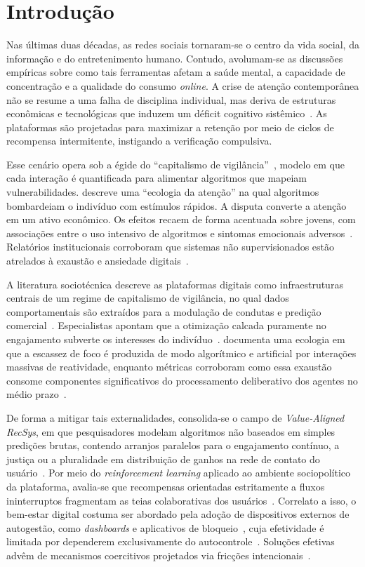 \documentclass{sbc2023}
\begin{document}
\section{Introdu{\c c}{\~a}o} \label{sec:intro}

Nas últimas duas décadas, as redes sociais tornaram-se o centro da vida social, da informação e do entretenimento humano. Contudo, avolumam-se as discussões empíricas sobre como tais ferramentas afetam a saúde mental, a capacidade de concentração e a qualidade do consumo \textit{online}. A crise de atenção contemporânea não se resume a uma falha de disciplina individual, mas deriva de estruturas econômicas e tecnológicas que induzem um déficit cognitivo sistêmico~\citep{hari2022}. As plataformas são projetadas para maximizar a retenção por meio de ciclos de recompensa intermitente, instigando a verificação compulsiva.

Esse cenário opera sob a égide do ``capitalismo de vigilância''~\citep{zuboff2019}, modelo em que cada interação é quantificada para alimentar algoritmos que mapeiam vulnerabilidades. \citet{citton2017} descreve uma ``ecologia da atenção'' na qual algoritmos bombardeiam o indivíduo com estímulos rápidos. A disputa converte a atenção em um ativo econômico. Os efeitos recaem de forma acentuada sobre jovens, com associações entre o uso intensivo de algoritmos e sintomas emocionais adversos~\citep{costello2023}. Relatórios institucionais corroboram que sistemas não supervisionados estão atrelados à exaustão e ansiedade digitais~\citep{hai2021}.

A literatura sociotécnica descreve as plataformas digitais como infraestruturas centrais de um regime de capitalismo de vigilância, no qual dados comportamentais são extraídos para a modulação de condutas e predição comercial~\citep{zuboff2019}. Especialistas apontam que a otimização calcada puramente no engajamento subverte os interesses do indivíduo~\citep{harris2019}. \citet{citton2017} documenta uma ecologia em que a escassez de foco é produzida de modo algorítmico e artificial por interações massivas de reatividade, enquanto métricas corroboram como essa exaustão consome componentes significativos do processamento deliberativo dos agentes no médio prazo~\citep{allcott2021}.

De forma a mitigar tais externalidades, consolida-se o campo de \textit{Value-Aligned RecSys}, em que pesquisadores modelam algoritmos não baseados em simples predições brutas, contendo arranjos paralelos para o engajamento contínuo, a justiça ou a pluralidade em distribuição de ganhos na rede de contato do usuário~\citep{stray2021}. Por meio do \textit{reinforcement learning} aplicado ao ambiente sociopolítico da plataforma, avalia-se que recompensas orientadas estritamente a fluxos ininterruptos fragmentam as teias colaborativas dos usuários~\citep{carvalho2023}. Correlato a isso, o bem-estar digital costuma ser abordado pela adoção de dispositivos externos de autogestão, como \textit{dashboards} e aplicativos de bloqueio~\citep{forest2020, rescuetime2020}, cuja efetividade é limitada por dependerem exclusivamente do autocontrole~\citep{lyngs2019}. Soluções efetivas advêm de mecanismos coercitivos projetados via fricções intencionais~\citep{kushlev2022}.
\end{document}
